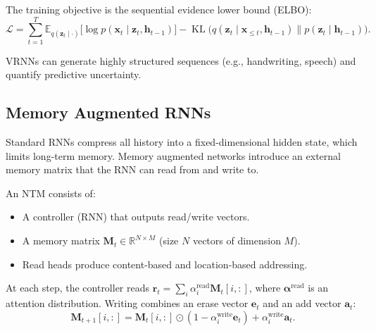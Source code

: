 \documentclass{tufte-handout}
\begin{document}
The training objective is the sequential evidence lower bound (ELBO):
\[
\mathcal{L} = \sum_{t=1}^T \mathbb{E}_{q(\mathbf{z}_t \mid \cdot)} \bigl[ \log p(\mathbf{x}_t \mid \mathbf{z}_t, \mathbf{h}_{t-1}) \bigr] - \operatorname{KL}\bigl( q(\mathbf{z}_t \mid \mathbf{x}_{\le t}, \mathbf{h}_{t-1}) \| p(\mathbf{z}_t \mid \mathbf{h}_{t-1}) \bigr).
\]

\begin{marginfigure}
\centering
{}
\caption{VRNN: deterministic RNN hidden states $\mathbf{h}_t$ and stochastic latents $\mathbf{z}_t$ interact.}
\end{marginfigure}

VRNNs can generate highly structured sequences (e.g., handwriting, speech) and quantify predictive uncertainty.

\subsection{Memory Augmented RNNs}

Standard RNNs compress all history into a fixed-dimensional hidden state, which limits long-term memory. Memory augmented networks introduce an external memory matrix that the RNN can read from and write to.

\begin{defn}
    An NTM consists of:
    \begin{itemize}
        \item A controller (RNN) that outputs read/write vectors.
        \item A memory matrix $\mathbf{M}_t \in \mathbb{R}^{N \times M}$ (size $N$ vectors of dimension $M$).
        \item Read heads produce content-based and location-based addressing.
    \end{itemize}
    At each step, the controller reads $\mathbf{r}_t = \sum_i \alpha_i^{\text{read}} \mathbf{M}_t[i,:]$, where $\boldsymbol{\alpha}^{\text{read}}$ is an attention distribution.
    Writing combines an erase vector $\mathbf{e}_t$ and an add vector $\mathbf{a}_t$:
    \[
    \mathbf{M}_{t+1}[i,:] = \mathbf{M}_t[i,:] \odot (1 - \alpha_i^{\text{write}} \mathbf{e}_t) + \alpha_i^{\text{write}} \mathbf{a}_t.
    \]
\end{defn}
\end{document}
